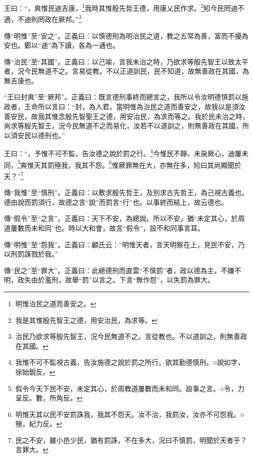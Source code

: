 王曰：“，爽惟民迪吉康，\footnote{明惟治民之道而善安之。}我時其惟殷先哲王德，用康乂民作求。\footnote{我是其惟殷先智王之德，用安治民，為求等。}矧今民罔迪不適，不迪則罔政在厥邦。”\footnote{治民乃欲求等殷先智王，況今民無道不之。言從教也。不以道訓之，則無善政在其國。}


{\noindent\zhuan{}\fzbyks 傳“明惟”至“安之”。正義曰：以慎德刑為明治民之道，教之五常為善，富而不擾為安也。鄭以“迪”為下讀，各為一通也。 \par}

{\noindent\zhuan{}\fzbyks 傳“治民”至“其國”。正義曰：以己喻，言我未治之時，乃欲求等殷先智王以致太平者，況今民無道不之。言易從教。不以正道訓民，民不知道，故無善政在其國，為無吉康也。 \par}

{\noindent\shu{}\fzkt “王曰封爽”至“厥邦”。正義曰：既言德刑事終而總言之，我所以令汝明德慎罰以施政者，王命所以言曰：“封，為人君，當明惟為治民之道而善安之，故我以是須汝善安民，故我其惟念殷先智聖王之德，用安治民，為求而等之。我於民未治之時，尚求等殷先智王，況今民無道不之而易化，汝若不以道訓之，則無善政在其國，所以須安民以德刑也。” \par}

王曰：“，予惟不可不監，告汝德之說於罰之行。\footnote{我惟不可不監視古義，告汝施德之說於罰之所行。欲其勤德慎刑。○說如字，徐始銳反。}今惟民不靜，未戾厥心，迪屢未同，\footnote{假令今天下民不安，未定其心，於周教道屢數而未和同。設事之言。○令，力呈反。數，所角反。}爽惟天其罰殛我，我其不怨。\footnote{明惟天其以民不安罰誅我，我其不怨天。汝不治，我罰汝，汝亦不可怨我。○殛，紀力反。}惟厥罪無在大，亦無在多，矧曰其尚顯聞於天？”\footnote{民之不安，雖小邑少民，猶有罰誅，不在多大，況曰不慎罰，明聞於天者乎？言罪大。}


{\noindent\zhuan{}\fzbyks 傳“我惟”至“慎刑”。正義曰：以敷求殷先哲王，及別求古先哲王，為己視古義也。德由說而罰須行，故德之言“說”而罰言“行”也。以事終而結上，故云德也。 \par}

{\noindent\zhuan{}\fzbyks 傳“假令”至“之言”。正義曰：天下不安，為總說。所以不安，猶“未定其心，於周道屢數而未和同”也。時以大和會，故言“假令”，設不和同事言耳。 \par}

{\noindent\zhuan{}\fzbyks 傳“明惟”至“怨我”。正義曰：顧氏云：“明惟天者，言天明察在上，見民不安，乃以刑罰誅戮於我。” \par}

{\noindent\zhuan{}\fzbyks 傳“民之”至“罪大”。正義曰：此總德刑而直雲“不慎罰”者，政以德為主，不嫌不明，政失由於濫刑，故舉“罰”以言之。下言“無作怨”，以失罰為罪大。 \par}

